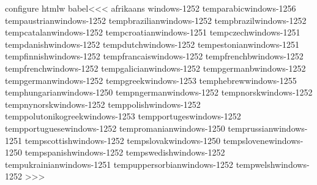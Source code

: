 \<configure htmlw babel\><<<
\def\:temp#1#2{%
   \def\:tempa{#1}\ifx \languagename\:tempa
      \def\A:charset{#2}\ifx \A:charset\empty\else
          \def\A:charset{charset=#2}%
   \fi\fi}
\:temp{afrikaans}{windows-1252}
\:temp{arabic}{windows-1256}
\:temp{austrian}{windows-1252}
\:temp{brazilian}{windows-1252}
\:temp{brazil}{windows-1252}
\:temp{catalan}{windows-1252}
\:temp{croatian}{windows-1251}
\:temp{czech}{windows-1251}
\:temp{danish}{windows-1252}
\:temp{dutch}{windows-1252}
\:temp{estonian}{windows-1251}
\:temp{finnish}{windows-1252}
\:temp{francais}{windows-1252}
\:temp{frenchb}{windows-1252}
\:temp{french}{windows-1252}
\:temp{galician}{windows-1252}
\:temp{germanb}{windows-1252}
\:temp{german}{windows-1252}
\:temp{greek}{windows-1253}
\:temp{hebrew}{windows-1255}
\:temp{hungarian}{windows-1250}
\:temp{ngerman}{windows-1252}
\:temp{norsk}{windows-1252}
\:temp{nynorsk}{windows-1252}
\:temp{polish}{windows-1252}
\:temp{polutonikogreek}{windows-1253}
\:temp{portuges}{windows-1252}
\:temp{portuguese}{windows-1252}
\:temp{romanian}{windows-1250}
\:temp{russian}{windows-1251}
\:temp{scottish}{windows-1252}
\:temp{slovak}{windows-1250}
\:temp{slovene}{windows-1250}
\:temp{spanish}{windows-1252}
\:temp{swedish}{windows-1252}
\:temp{ukrainian}{windows-1251}
\:temp{uppersorbian}{windows-1252}
\:temp{welsh}{windows-1252}
>>>


